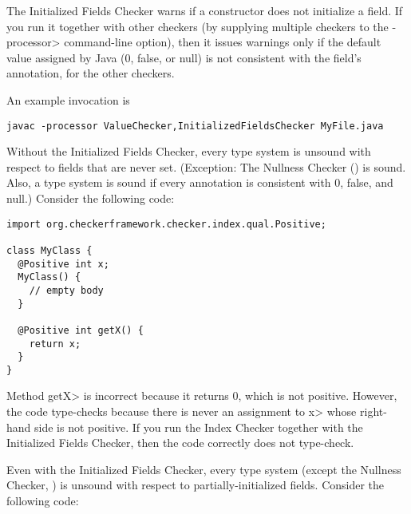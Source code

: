 \htmlhr
{}

The Initialized Fields Checker warns if a constructor does not initialize a
field.
If you run it together with other checkers (by supplying multiple checkers
to the \<-processor> command-line option), then it issues warnings only if
the default value assigned by Java (0, false, or null) is not consistent
with the field's annotation, for the other checkers.

An example invocation is

\begin{Verbatim}
javac -processor ValueChecker,InitializedFieldsChecker MyFile.java
\end{Verbatim}



Without the Initialized Fields Checker, every type system is
unsound with respect to fields that are never set.  (Exception:  The
Nullness Checker () is sound. Also, a type
system is sound if every annotation is consistent with 0, false, and null.)
Consider the following code:

\begin{Verbatim}
import org.checkerframework.checker.index.qual.Positive;

class MyClass {
  @Positive int x;
  MyClass() {
    // empty body
  }

  @Positive int getX() {
    return x;
  }
}
\end{Verbatim}

\noindent
Method \<getX> is incorrect because it returns 0, which is not positive.
However, the code type-checks because there is never an assignment to \<x>
whose right-hand side is not positive.
If you run the Index Checker together with the Initialized Fields Checker,
then the code correctly does not type-check.



Even with the Initialized Fields Checker, every type system (except the
Nullness Checker, ) is unsound with
respect to partially-initialized fields.  Consider the following code:

